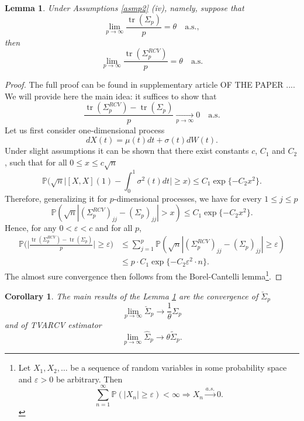 \documentclass[a4paper,11pt]{book}
\theoremstyle{plain}
\newtheorem{lmm}[thm]{Lemma}
\newtheorem{crlr}[thm]{Corollary}
\theoremstyle{definition}
\newcommand{\MP}{\mathbb{P}}
\newcommand{\tr}{\operatorname{tr}}
\begin{document}
    \begin{lmm} \label{trace conv}
    	Under Assumptions \ref{asmp2} (iv), namely, suppose that
    	\[ \lim_{p \rightarrow \infty} \frac{\tr(\Sigma_p)}{p} = \theta \quad \text{a.s.}, \]
    	then
    	\[ \lim_{p \rightarrow \infty} \frac{\tr(\Sigma_p^{RCV})}{p} = \theta \quad \text{a.s.} \]
    \end{lmm}
    \begin{proof}
    	The full proof can be found in supplementary article OF THE PAPER .... We will provide here the main idea: it suffices to show that
    	\[ \frac{\tr(\Sigma_p^{RCV})-\tr(\Sigma_p)}{p} \xrightarrow[p \rightarrow \infty]{} 0 \quad \text{a.s.} \]
    	Let us first consider one-dimensional process
    	\[ dX(t) = \mu(t)dt + \sigma(t)dW(t). \]
    	Under slight assumptions it can be shown that there exist constants $c$, $C_1$ and $C_2$, such that for all $0 \leq x \leq c \sqrt{n}$
    	\[\MP\Big(\sqrt{n} \Big| [X, X](1) - \int_{0}^{1} \sigma^2(t)dt \Big| \geq x \Big) \leq C_1 \exp \{ -C_2 x^2 \}. \]
    	Therefore, generalizing it for $p$-dimensional processes, we have for every $1 \leq j \leq p$
    	\[ \MP(\sqrt{n} |(\Sigma_p^{RCV})_{jj} - (\Sigma_p)_{jj} | > x) \leq C_1 \exp \{ -C_2 x^2 \}. \]
    	Hence, for any $0 < \varepsilon < c$ and for all $p$,
    	\[ 
    	\begin{aligned}
    	\MP \Bigg(  \Bigg| \frac{\tr(\Sigma_p^{RCV})-\tr(\Sigma_p)}{p}  \Bigg| \geq \varepsilon \Bigg) & \leq \sum_{j=1}^{p} \MP(\sqrt{n} |(\Sigma_p^{RCV})_{jj} - (\Sigma_p)_{jj} | \geq \varepsilon) \\
    	& \leq p \cdot C_1 \exp \{ -C_2 \varepsilon^2 \cdot n  \}.
    	\end{aligned}
    	\]
    	The almost sure convergence then follows from the Borel-Cantelli lemma\footnote{
    		Let $X_1, X_2, \dots$ be a sequence of random variables in some probability space and $\varepsilon > 0$ be arbitrary.
    		Then
    		\[ \sum_{n=1}^{\infty} \MP(|X_n| \geq \varepsilon) < \infty \Longrightarrow X_n \xrightarrow{a.s.} 0.  \]
    	}.
    \end{proof}
    
    \begin{crlr} \label{crlr trace conv}
    	The main results of the Lemma \ref{trace conv} are the convergence of $\breve{\Sigma}_p$ 
    	\[ \lim_{p \rightarrow \infty} \breve{\Sigma}_p \rightarrow \frac{1}{\theta} \Sigma_p \]
    	and of TVARCV estimator
    	\[ \lim_{p \rightarrow \infty} \widehat{\Sigma}_p \rightarrow \theta \widetilde{\Sigma}_p. \]
    \end{crlr}
    
\end{document}

